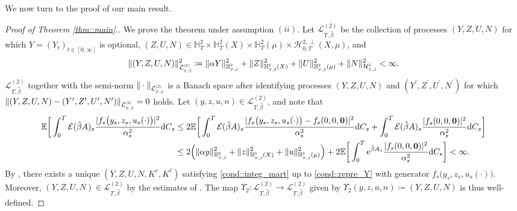 \documentclass[10pt]{article} %
\newcommand\cE{\mathcal E}
\newcommand\cH{\mathcal H}
\newcommand\cL{\mathcal L}
\newcommand{\smalltext}[1]{\text{\fontsize{4}{4}\selectfont$#1$}}
\def \E{\mathbb{E}}
\def \H{\mathbb{H}}
\def\d{\mathrm{d}}
\begin{document}
We now turn to the proof of our main result.

\begin{proof}[Proof of Theorem \ref{thm::main}.]\label{proof::main}
	We prove the theorem under assumption $(ii)$. Let $\cL^{(2)}_{T,\hat\beta}$ be the collection of processes $(Y,Z,U,N)$ for which $Y = (Y_t)_{t \in [0,\infty]}$ is optional, $(Z,U,N) \in \H^2_T \times \H^2_T(X) \times \H^2_T(\mu) \times \cH^{2,\perp}_{0,T}(X,\mu)$, and
	\begin{equation*}
		\|(Y,Z,U,N)\|^2_{\cL^\smalltext{(2)}_{\smalltext{T}\smalltext{,}\smalltext{\hat\beta}}} \coloneqq \|\alpha Y\|^2_{\H^\smalltext{2}_{\smalltext{T}\smalltext{,}\smalltext{\hat\beta}}} + \|Z\|^2_{\H^\smalltext{2}_{\smalltext{T}\smalltext{,}\smalltext{\hat\beta}}(X)} + \|U\|^2_{\H^\smalltext{2}_{\smalltext{T}\smalltext{,}\smalltext{\hat\beta}}(\mu)} + \|N\|^2_{\cH^\smalltext{2}_{\smalltext{T}\smalltext{,}\smalltext{\hat\beta}}} < \infty.
	\end{equation*}
	$\cL^{(2)}_{T,\hat\beta}$ together with the semi-norm $\|\cdot\|_{\cL^\smalltext{(2)}_{\smalltext{T}\smalltext{,}\smalltext{\hat\beta}}}$ is a Banach space after identifying processes $(Y,Z,U,N)$ and $(Y^\prime,Z^\prime,U^\prime,N^\prime)$ for which $\|(Y,Z,U,N) - (Y^\prime,Z^\prime,U^\prime,N^\prime)\|_{\cL^\smalltext{(2)}_{\smalltext{T}\smalltext{,}\smalltext{\hat\beta}}} = 0$ holds. Let $(y,z,u,n) \in \cL^{(2)}_{T,\hat\beta}$, and note that
	\begin{align*}
		\E \bigg[ \int_0^T \cE(\hat\beta A)_s \frac{|f_s\big(y_s,z_s,u_s(\cdot)\big)|^2}{\alpha^2_s} \d C_s 
		&\leq 2 \E \bigg[ \int_0^T \cE(\hat\beta A)_s \frac{|f_s\big(y_s,z_s,u_s(\cdot)\big) - f_s(0,0,{\bf 0})|^2}{\alpha^2_s} \d C_s 
		+ \int_0^T \cE(\hat\beta A)_s \frac{|f_s(0,0,{\bf 0})|^2}{\alpha^2_s} \d C_s \bigg] \\
		&\leq 2\Big( \|\alpha y\|^2_{\H^\smalltext{2}_{\smalltext{T}\smalltext{,}\smalltext{\hat\beta}}} + \|z\|^2_{\H^\smalltext{2}_{\smalltext{T}\smalltext{,}\smalltext{\hat\beta}}(X)} + \|u\|^2_{\H^\smalltext{2}_{\smalltext{T}\smalltext{,}\smalltext{\hat\beta}}(\mu)}\Big) + 2 \E \bigg[ \int_0^T \mathrm{e}^{\hat\beta A_s} \frac{|f_s(0,0,{\bf 0})|^2}{\alpha^2_s} \d C_s\bigg] < \infty.
	\end{align*}
	By , there exists a unique $(Y,Z,U,N,K^r,K^\ell)$ satisfying \ref{cond::integ_mart} up to \ref{cond::repre_Y} with generator $f_s\big(y_s,z_s,u_s(\cdot)\big)$. Moreover, $(Y,Z,U,N) \in \cL^{(2)}_{T,\hat\beta}$ by the estimates of . The map $\Upsilon_2 : \cL^{(2)}_{T,\hat\beta} \longrightarrow \cL^{(2)}_{T,\hat\beta}$ given by $\Upsilon_2(y, z, u, n) \coloneqq (Y, Z, U, N)$ is thus well-defined. 
	

\end{proof}
\end{document}
